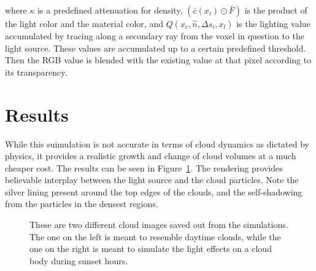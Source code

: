 \documentclass{jcgt}
\begin{document}
\noindent
where $\kappa$ is a predefined attenuation for density, $(\bar{c}(x_i)\odot \bar{F})$
is the product of the light color and the material color, and $Q(x_c,\hat{n},\Delta s_i, x_l)$
is the lighting value accumulated by tracing along a secondary ray from the voxel in
question to the light source. These values are accumulated up to a certain predefined threshold. 
Then the RGB value is blended with the existing value at that pixel
according to its transparency.

\section{Results}

While this suimulation is not accurate in terms of cloud dynamics as dictated by physics, 
it provides a realistic growth and change of cloud volumes at a much cheaper cost. 
The results can be seen in Figure~\ref{fig:cloud_renders}. The rendering provides believable interplay
between the light source and the cloud particles. Note the silver lining present around the
top edges of the clouds, and the self-shadowing from the particles in the densest regions.


\begin{figure}[htb]
  \centering
  \hfill
  \hfill
  \hfill
  \caption{\label{fig:cloud_renders}
     These are two different cloud images saved out from the simulations. The one on the
     left is meant to resemble daytime clouds, while the one on the right is meant to
     simulate the light effects on a cloud body during sunset hours.}
\end{figure}
\end{document}
